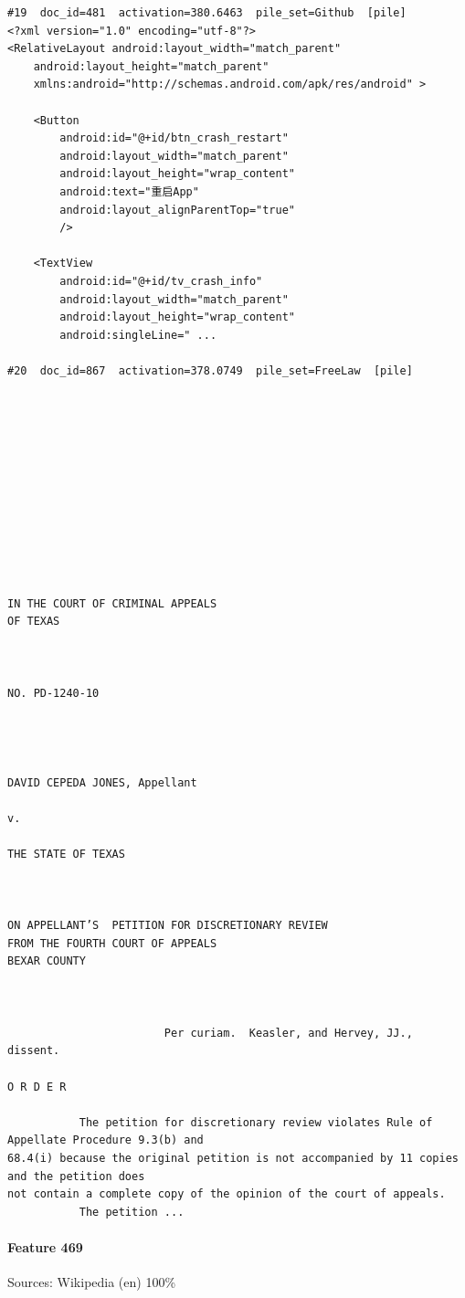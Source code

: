 \begin{verbatim}
#19  doc_id=481  activation=380.6463  pile_set=Github  [pile]
<?xml version="1.0" encoding="utf-8"?>
<RelativeLayout android:layout_width="match_parent"
    android:layout_height="match_parent"
    xmlns:android="http://schemas.android.com/apk/res/android" >

    <Button
        android:id="@+id/btn_crash_restart"
        android:layout_width="match_parent"
        android:layout_height="wrap_content"
        android:text="重启App"
        android:layout_alignParentTop="true"
        />

    <TextView
        android:id="@+id/tv_crash_info"
        android:layout_width="match_parent"
        android:layout_height="wrap_content"
        android:singleLine=" ...

#20  doc_id=867  activation=378.0749  pile_set=FreeLaw  [pile]












IN THE COURT OF CRIMINAL APPEALS
OF TEXAS



NO. PD-1240-10




DAVID CEPEDA JONES, Appellant

v.

THE STATE OF TEXAS



ON APPELLANT’S  PETITION FOR DISCRETIONARY REVIEW
FROM THE FOURTH COURT OF APPEALS
BEXAR COUNTY



                        Per curiam.  Keasler, and Hervey, JJ., dissent.

O R D E R 

           The petition for discretionary review violates Rule of Appellate Procedure 9.3(b) and
68.4(i) because the original petition is not accompanied by 11 copies and the petition does
not contain a complete copy of the opinion of the court of appeals.
           The petition ...

\end{verbatim}

\paragraph*{Feature 469} Sources: Wikipedia (en) 100\%

